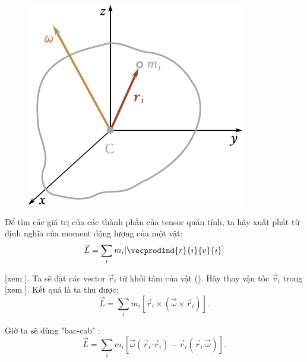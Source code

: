 \begin{figure}[!htb]
	\begin{center}
		\includegraphics[scale=1.0]{figures/ch_05/fig_5_16.pdf}
		\caption[]{}
		\label{fig:5_16}
	\end{center}
\end{figure}

Để tìm các giá trị của các thành phần của tensor quán tính, ta hãy xuất phát từ định nghĩa của moment động lượng của một vật:
\begin{equation}\label{eq:5_35}
\vec{L} = \sum_i m_i [\vecprodind{r}{i}{v}{i}]
\end{equation}

\noindent
[xem ]. Ta sẽ đặt các vector $\vec{r}_i$ từ khối tâm của vật (). Hãy thay vận tốc $\vec{v}_i$ trong  [xem ]. Kết quả là ta thu được:
\begin{equation*}
\vec{L} = \sum_i m_i [\vec{r}_i \times (\vec{\omega} \times \vec{r}_i)].
\end{equation*}

\noindent
Giờ ta sẽ dùng "bac-cab" :
\begin{equation}\label{eq:5_36}
\vec{L} = \sum_i m_i [\vec{\omega}(\vec{r}_i\boldsymbol{\cdot}\vec{r}_i) - \vec{r}_i(\vec{r}_i\boldsymbol{\cdot}\vec{\omega})].
\end{equation}

